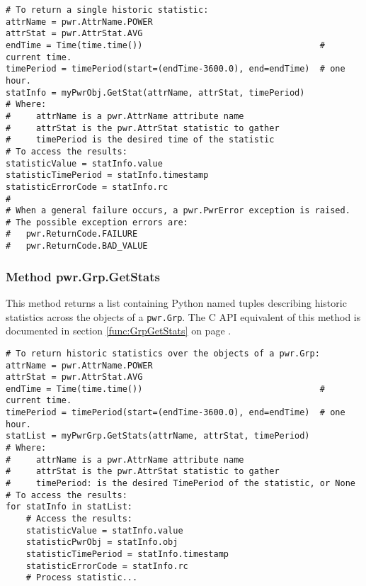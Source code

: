 \documentclass[12pt]{report} %
\begin{document}
\begin{appendices}
\begin{center}\begin{minipage}{.95\linewidth}\begin{lstlisting}
# To return a single historic statistic:
attrName = pwr.AttrName.POWER
attrStat = pwr.AttrStat.AVG
endTime = Time(time.time())                                   # current time.
timePeriod = timePeriod(start=(endTime-3600.0), end=endTime)  # one hour.
statInfo = myPwrObj.GetStat(attrName, attrStat, timePeriod)
# Where:
#     attrName is a pwr.AttrName attribute name
#     attrStat is the pwr.AttrStat statistic to gather
#     timePeriod is the desired time of the statistic
# To access the results:
statisticValue = statInfo.value
statisticTimePeriod = statInfo.timestamp
statisticErrorCode = statInfo.rc
#
# When a general failure occurs, a pwr.PwrError exception is raised.
# The possible exception errors are:
#   pwr.ReturnCode.FAILURE
#   pwr.ReturnCode.BAD_VALUE
\end{lstlisting}\end{minipage}\end{center}

\subsubsection{Method pwr.Grp.GetStats} \label{class:GrpGetStats}

This method returns a list containing Python named tuples describing historic statistics
across the objects of a \texttt{pwr.Grp}.
The C API equivalent of this method is documented in section
\ref{func:GrpGetStats} on page \pageref{func:GrpGetStats}.

\begin{center}\begin{minipage}{.95\linewidth}\begin{lstlisting}
# To return historic statistics over the objects of a pwr.Grp:
attrName = pwr.AttrName.POWER
attrStat = pwr.AttrStat.AVG
endTime = Time(time.time())                                   # current time.
timePeriod = timePeriod(start=(endTime-3600.0), end=endTime)  # one hour.
statList = myPwrGrp.GetStats(attrName, attrStat, timePeriod)
# Where:
#     attrName is a pwr.AttrName attribute name
#     attrStat is the pwr.AttrStat statistic to gather
#     timePeriod: is the desired TimePeriod of the statistic, or None
# To access the results:
for statInfo in statList:
    # Access the results:
    statisticValue = statInfo.value
    statisticPwrObj = statInfo.obj
    statisticTimePeriod = statInfo.timestamp
    statisticErrorCode = statInfo.rc
    # Process statistic...
\end{lstlisting}\end{minipage}\end{center}


\end{appendices}
\end{document}
